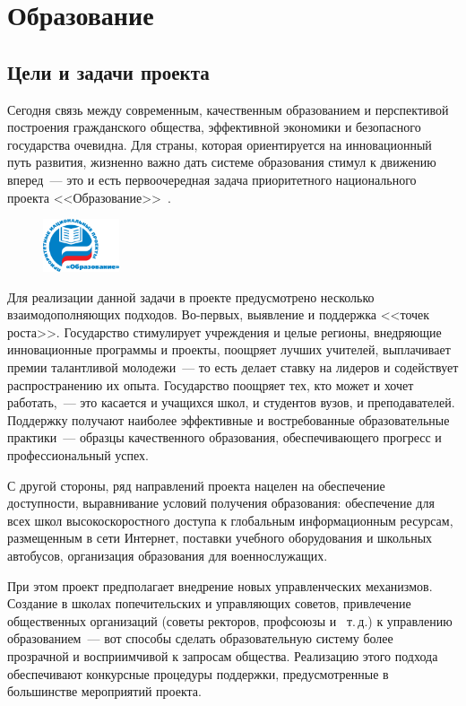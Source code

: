 \documentclass[article, 12pt, russian, oneside]{ncc}
\begin{document}
\section{Образование}

\subsection{Цели и задачи проекта}

Сегодня связь между современным, качественным образованием и
перспективой построения гражданского общества, эффективной экономики и
безопасного государства очевидна. Для страны, которая ориентируется на
инновационный путь развития, жизненно важно дать системе образования
стимул к движению вперед~--- это и есть первоочередная задача
приоритетного национального проекта
<<Образование>>~\cite{Edu_Problems}.

\begin{figure}
  \begin{center}
    \includegraphics[width=0.2\textwidth]{NPR_Edu}
  \end{center}
\end{figure}

Для реализации данной задачи в проекте предусмотрено несколько
взаимодополняющих подходов. Во-первых, выявление и поддержка <<точек
роста>>. Государство стимулирует учреждения и целые регионы,
внедряющие инновационные программы и проекты, поощряет лучших
учителей, выплачивает премии талантливой молодежи~--- то есть делает
ставку на лидеров и содействует распространению их опыта. Государство
поощряет тех, кто может и хочет работать,~--- это касается и учащихся
школ, и студентов вузов, и преподавателей. Поддержку получают наиболее
эффективные и востребованные образовательные практики~--- образцы
качественного образования, обеспечивающего прогресс и профессиональный
успех.

С другой стороны, ряд направлений проекта нацелен на обеспечение
доступности, выравнивание условий получения образования: обеспечение
для всех школ высокоскоростного доступа к глобальным информационным
ресурсам, размещенным в сети Интернет, поставки учебного оборудования
и школьных автобусов, организация образования для военнослужащих.

При этом проект предполагает внедрение новых управленческих
механизмов. Создание в школах попечительских и управляющих советов,
привлечение общественных организаций (советы ректоров, профсоюзы и~
т.\,д.) к управлению образованием~--- вот способы сделать
образовательную систему более прозрачной и восприимчивой к запросам
общества. Реализацию этого подхода обеспечивают конкурсные процедуры
поддержки, предусмотренные в большинстве мероприятий проекта.
\end{document}
